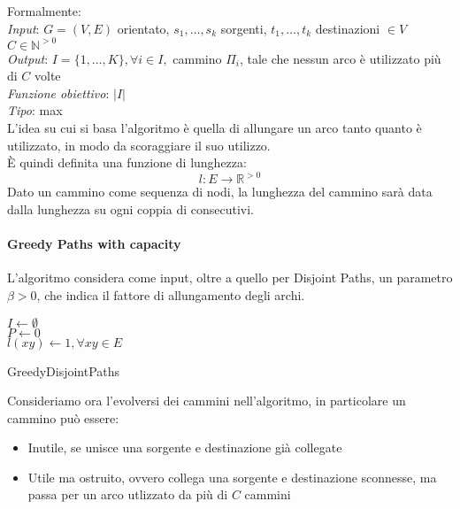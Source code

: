 Formalmente: \\
\emph{Input}: $G=(V,E)$ orientato, $s_1, \dots, s_k$ sorgenti, $t_1, \dots, t_k$ destinazioni $\in V$
$C \in \mathbb{N}^{>0}$\\
\emph{Output}: $I = \{1, \dots, K\}, \forall i \in I,$ cammino $\Pi_i$, tale che nessun arco è utilizzato più di $C$ volte\\
\emph{Funzione obiettivo}: $|I|$\\
\emph{Tipo}: max\\

L'idea su cui si basa l'algoritmo è quella di allungare un arco tanto quanto è utilizzato, 
in modo da scoraggiare il suo utilizzo.\\
È quindi definita una funzione di lunghezza: 
$$l : E \longrightarrow \mathbb{R}^{>0}$$
Dato un cammino come sequenza di nodi, la lunghezza del cammino sarà data dalla lunghezza su ogni coppia di consecutivi.

\paragraph{Greedy Paths with capacity}
L'algoritmo considera come input, oltre a quello per Disjoint Paths, un parametro
$\beta > 0$, che indica il fattore di allungamento degli archi.

\begin{algorithm}[H]
    \SetAlgoLined
     $I \gets \emptyset$\\
     $P \gets 0$\\
     $l(xy) \gets 1, \forall xy \in E$\\
     \caption{GreedyDisjointPaths}
\end{algorithm}

Consideriamo ora l'evolversi dei cammini nell'algoritmo, in particolare un cammino
può essere:
\begin{itemize}
    \item Inutile, se unisce una sorgente e destinazione già collegate
    \item Utile ma ostruito, ovvero collega una sorgente e destinazione sconnesse, 
    ma passa per un arco utlizzato da più di $C$ cammini
\end{itemize}

